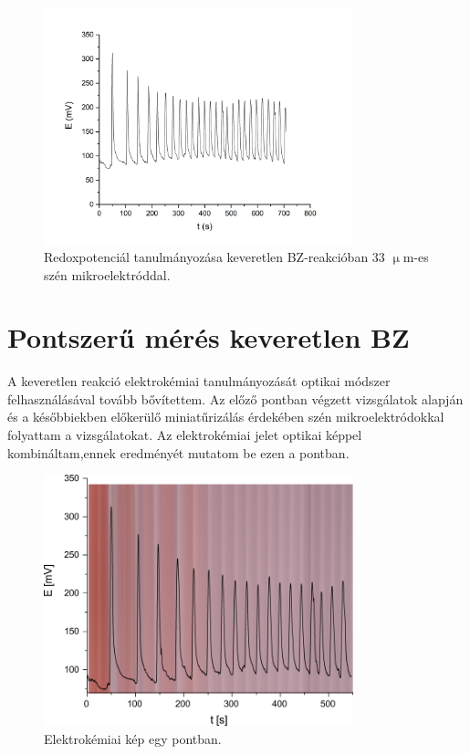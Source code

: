 \begin{figure}[h]
\centering
\includegraphics[width=0.8\textwidth]{img/szen33_keveretlen.jpg}
\caption{Redoxpotenciál tanulmányozása keveretlen BZ-reakcióban 33 $\upmu$m-es szén mikroelektróddal.}
\label{fig:szen33_keveretlen}
\end{figure}

\section{Pontszerű mérés keveretlen BZ}
A keveretlen reakció elektrokémiai tanulmányozását optikai módszer felhasználásával tovább bővítettem. Az előző pontban végzett vizsgálatok alapján és a későbbiekben előkerülő miniatűrizálás érdekében szén mikroelektródokkal folyattam a vizsgálatokat. Az elektrokémiai jelet optikai képpel kombináltam,ennek eredményét  mutatom be ezen a pontban.
\begin{figure}[h]
\centering
\includegraphics[width=0.8\textwidth]{img/pontszerumeres.png}
\caption{Elektrokémiai kép egy pontban.}
\label{fig:pontszerumeres}
\end{figure}

